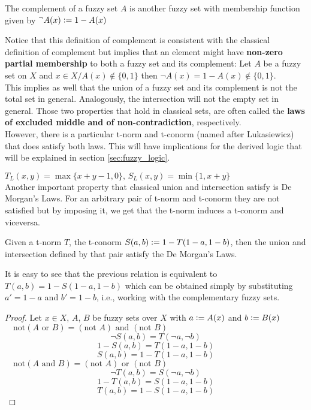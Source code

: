 \begin{definition}[Complement]
    The complement of a fuzzy set $A$ is another fuzzy set with membership function given by $^\lnot A(x) \mathrel{\mathop:}= 1 - A(x)$
\end{definition}

Notice that this definition of complement is consistent with the classical definition of complement but implies that an element might have \textbf{non-zero partial membership} to both a fuzzy set and its complement: Let $A$ be a fuzzy set on $X$ and $x \in X / A(x)\notin \{0,1\}$ then $\lnot A(x)= 1 - A(x) \notin \{0,1\}$.\\

This implies as well that the union of a fuzzy set and its complement is not the total set in general. Analogously, the intersection will not the empty set in general. Those two properties that hold in classical sets, are often called the \textbf{laws of excluded middle and of non-contradiction}, respectively.\\

However, there is a particular t-norm and t-conorm (named after Lukasiewicz) that does satisfy both laws. This will have implications for the derived logic that will be explained in section \ref{sec:fuzzy_logic}. 

\hspace{10em}$T_L(x,y)=\max\{x+y-1,0\},\, S_L(x,y)=\min\{1,x+y\}$\\

Another important property that classical union and intersection satisfy is De Morgan's Laws. For an arbitrary pair of t-norm and t-conorm they are not satisfied but by imposing it, we get that the t-norm induces a t-conorm and viceversa.

\begin{proposition}
  Given a t-norm $T$, the t-conorm $S(a,b)\mathrel{\mathop:}= 1 - T(1-a, 1-b)$, then the union and intersection defined by that pair satisfy the De Morgan's Laws.
\end{proposition}
\begin{remark}
  It is easy to see that the previous relation is equivalent to $T(a,b) = 1-S(1-a, 1-b)$ which can be obtained simply by substituting $a'=1-a$ and $b'=1-b$, i.e., working with the complementary fuzzy sets.
\end{remark}

\begin{proof}
  Let $x\in X$, $A$, $B$ be fuzzy sets over $X$ with $a \mathrel{\mathop:}= A(x)$ and $b \mathrel{\mathop:}= B(x)$\\

  $\quad \boxed{\text{not}(A \text{ or } B) = (\text{not } A) \text{ and } (\text{not } B)}$\\
  $$\lnot S(a,b) = T(\lnot a, \lnot b)$$
  $$1 - S(a,b) = T(1-a, 1-b)$$
  $$S(a,b) = 1 - T(1-a, 1-b)$$
  $\quad \boxed{\text{not}(A \text{ and } B) = (\text{not } A) \text{ or } (\text{not } B)}$\\
  $$\lnot T(a,b) = S(\lnot a, \lnot b)$$
  $$1 - T(a,b) = S(1-a, 1-b)$$
  $$T(a,b) = 1 - S(1-a, 1-b)$$

\end{proof}

